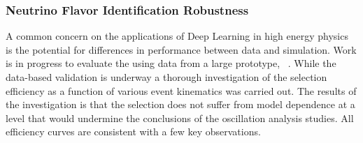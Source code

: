 
\subsubsection{Neutrino Flavor Identification Robustness}
A common concern on the applications of Deep Learning in high energy physics is the potential for differences in performance between data and simulation. Work is in progress to evaluate the   using data from a large  prototype, ~\cite{Abi:2017aow}.
While the data-based validation is underway a thorough investigation of the selection efficiency as a function of various event kinematics was carried out. The results of the investigation is that the  selection does not suffer from model dependence at a level that would undermine the conclusions of the oscillation analysis studies. All efficiency curves are consistent with a few key observations. 

